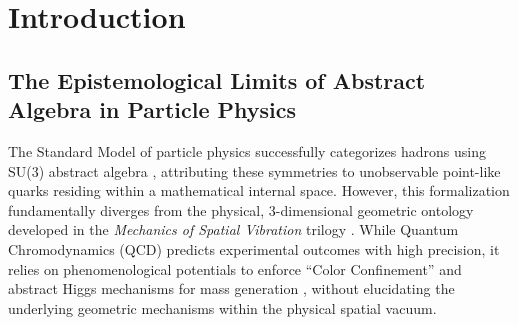 \documentclass[reprint,amsmath,amssymb,aps,prd]{revtex4-2}
\begin{document}
\begin{abstract}
Finally, we formalize the arbitrary quantum number of ``Strangeness'' as the torsional winding tension ($\mathcal{W}$) of the topological knot. Strong interaction conservation is derived via Kelvin's circulation theorem for an ideal fluid, whereas weak interaction decay is mathematically modeled as topological decoherence (unknotting). This unwinding process is strictly governed by the same real-valued, non-linear \textbf{`spatial geometric viscosity'} ($+\gamma(S - \langle S \rangle)$) that drives \textbf{`Phase Turbulence'} (Part I). By bridging abstract group theory with deterministic spatial geomechanics, this study offers a complete mathematical realization of a \textbf{`Periodic Table of Space,'} seamlessly unifying the microscopic particle zoo with continuous spatial tensor dynamics under the universal principle of \textbf{`Fractal Scale Symmetry'} (Part III).
\end{abstract}

\maketitle

\section{Introduction}

\subsection{The Epistemological Limits of Abstract Algebra in Particle Physics}
The Standard Model of particle physics successfully categorizes hadrons using SU(3) abstract algebra \cite{GellMann1964}, attributing these symmetries to unobservable point-like quarks residing within a mathematical internal space. However, this formalization fundamentally diverges from the physical, 3-dimensional geometric ontology developed in the \textit{Mechanics of Spatial Vibration} trilogy \cite{YooPart1, YooPart2, YooPart3}. While Quantum Chromodynamics (QCD) predicts experimental outcomes with high precision, it relies on phenomenological potentials to enforce ``Color Confinement'' \cite{Wilson1974} and abstract Higgs mechanisms for mass generation \cite{Higgs1964}, without elucidating the underlying geometric mechanisms within the physical spatial vacuum.
\end{document}
